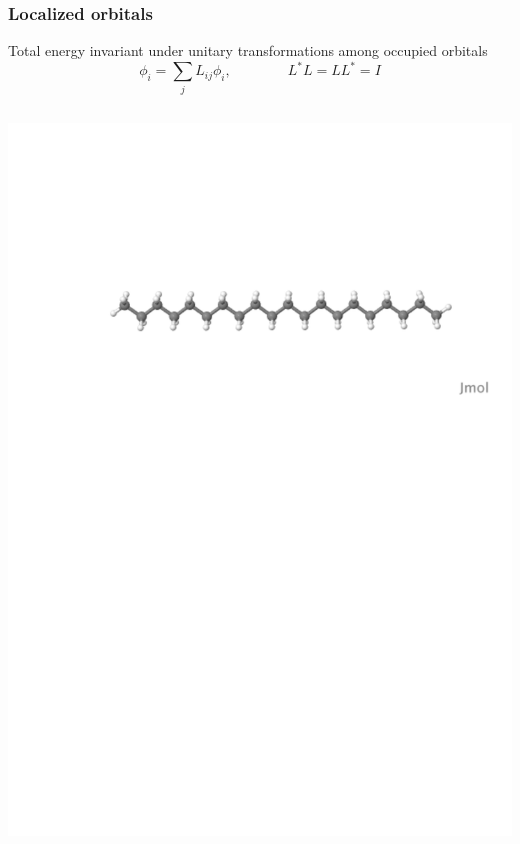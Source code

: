 \begin{frame}
    \frametitle{Localized orbitals}
    \centering
    Total energy invariant under unitary transformations among occupied orbitals
    \begin{equation}
	\nonumber
	\phi_i = \sum_j L_{ij} \phi_i, \qquad \qquad L^\ast L = LL^\ast = I
    \end{equation}

    \begin{columns}
    \begin{column}[b]{0.48\linewidth}
    \centering
    \includegraphics[scale=0.25, clip, viewport = 80 560 600 700]{figures/alkane.pdf}\\

\end{column}
\end{columns}
\end{frame}
